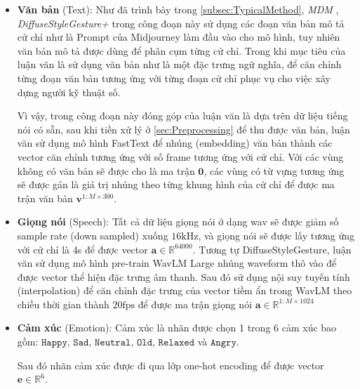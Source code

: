 \begin{itemize}
	\item \textbf{Văn bản} (Text):
		Như đã trình bày trong \autoref{subsec:TypicalMethod}, \textit{MDM} \cite{tevet2022human}, \textit{DiffuseStyleGesture+} \cite{yang2022DiffuseStyleGestureplus} trong công đoạn này sử dụng các đoạn văn bản mô tả cử chỉ như là Prompt của Midjourney làm đầu vào cho mô hình, tuy nhiên văn bản mô tả được dùng để phân cụm từng cử chỉ. Trong khi mục tiêu của luận văn là sử dụng văn bản như là một đặc trưng ngữ nghĩa, để căn chỉnh từng đoạn văn bản tương ứng với  từng đoạn cử chỉ phục vụ cho việc xây dựng người kỹ thuật số.
		
		Vì vậy, trong công đoạn này đóng góp của luận văn là dựa trên dữ liệu tiếng nói có sẵn, sau khi tiền xử lý ở \autoref{sec:Preprocessing} để thu được văn bản,  luận văn sử dụng mô hình FastText  \cite{bojanowski2017enriching} để nhúng (embedding) văn bản thành các vector căn chỉnh tương ứng với số frame tương ứng với cử chỉ. Với các vùng không có văn bản sẽ được cho là ma trận $\mathbf{0}$, các vùng có từ vựng tương ứng sẽ được gán là giá trị nhúng  theo từng khung hình của cử chỉ để được ma trận văn bản $\mathbf{v}^{1:M \times 300}$.
		
		\item \textbf{Giọng nói} (Speech): Tất cả dữ liệu giọng nói ở dạng wav sẽ được giảm số sample rate (down sampled) xuống $16 \mathrm{kHz}$, và giọng nói sẽ được lấy tương ứng với cử chỉ là 4s để được vector $\mathbf{a} \in \mathbb{R}^{64000}$. Tương tự DiffuseStyleGesture, luận văn sử dụng mô hình pre-train WavLM Large \cite{Chen_2022} nhúng waveform thô vào để được vector thể hiện đặc trưng âm thanh. Sau đó sử dụng nội suy tuyến tính (interpolation) để căn chỉnh đặc trưng của vector tiềm ẩn trong WavLM theo chiều thời gian thành $20 \text{fps}$ để được ma trận giọng nói $\mathbf{a} \in \mathbb{R}^{1:M \times 1024}$
		
		\item \textbf{Cảm xúc} (Emotion): Cảm xúc là nhãn được chọn 1 trong 6 cảm xúc bao gồm: $\texttt{Happy}$, $\texttt{Sad}$, $\texttt{Neutral}$, $\texttt{Old}$, $\texttt{Relaxed}$ và $\texttt{Angry}$. 
		
		Sau đó nhãn cảm xúc được đi qua lớp one-hot encoding để được vector  $\mathbf{e} \in \mathbb{R}^{6}$.
		
		
		

\end{itemize}

